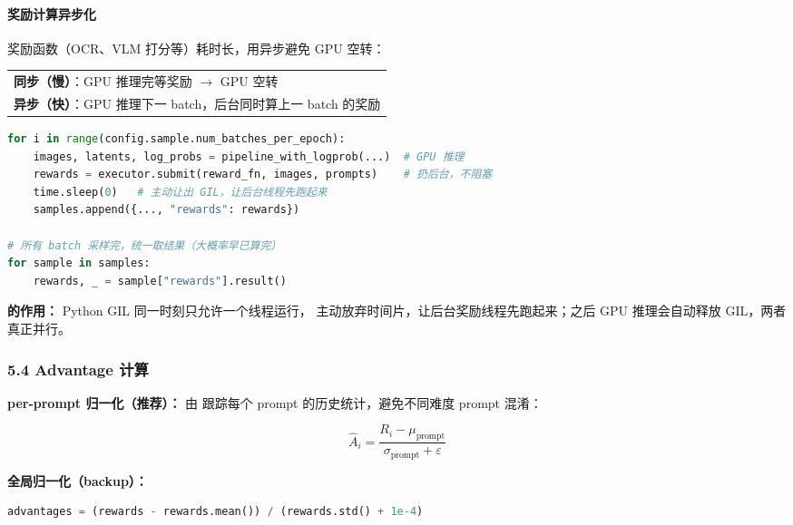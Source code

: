 \paragraph{奖励计算异步化}

奖励函数（OCR、VLM 打分等）耗时长，用异步避免 GPU 空转：

\begin{center}
\begin{tabular}{p{13cm}}
\hline
\textbf{同步（慢）}：GPU 推理完等奖励 $\to$ GPU 空转\\
\textbf{异步（快）}：GPU 推理下一 batch，后台同时算上一 batch 的奖励\\
\hline
\end{tabular}
\end{center}

\begin{lstlisting}[language=Python]
for i in range(config.sample.num_batches_per_epoch):
    images, latents, log_probs = pipeline_with_logprob(...)  # GPU 推理
    rewards = executor.submit(reward_fn, images, prompts)    # 扔后台，不阻塞
    time.sleep(0)   # 主动让出 GIL，让后台线程先跑起来
    samples.append({..., "rewards": rewards})

# 所有 batch 采样完，统一取结果（大概率早已算完）
for sample in samples:
    rewards, _ = sample["rewards"].result()
\end{lstlisting}

\begin{intubox}
\textbf{ 的作用：} Python GIL 同一时刻只允许一个线程运行， 主动放弃时间片，让后台奖励线程先跑起来；之后 GPU 推理会自动释放 GIL，两者真正并行。
\end{intubox}

\subsubsection{5.4 Advantage 计算}

\textbf{per-prompt 归一化（推荐）：} 由  跟踪每个 prompt 的历史统计，避免不同难度 prompt 混淆：

\[
\hat{A}_i = \frac{R_i - \mu_{\text{prompt}}}{\sigma_{\text{prompt}} + \varepsilon}
\]

\textbf{全局归一化（backup）：}

\begin{lstlisting}[language=Python]
advantages = (rewards - rewards.mean()) / (rewards.std() + 1e-4)
\end{lstlisting}

